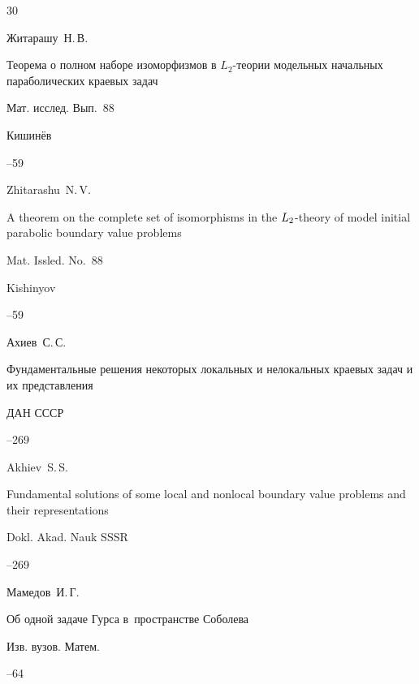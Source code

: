 \begin{thebibliography}{30}

\by Житарашу~Н.\,В.

\paper Теорема о полном наборе изоморфизмов в $L_2$-теории модельных начальных параболических краевых задач

\inbook Мат. исслед. Вып.~88

\publaddr Кишинёв


--59

\misctransl

\by Zhitarashu~N.\,V.

\paper A theorem on the complete set of isomorphisms in the $L\sb 2$-theory of model initial parabolic boundary value problems

\inbook Mat. Issled.  No.~88

\publaddr Kishinyov


–59




\by Ахиев~С.\,С.

\paper Фундаментальные решения некоторых локальных и нелокальных краевых задач и их представления

\jour ДАН СССР




--269

\misctransl

\by Akhiev~S.\,S. 

\paper Fundamental solutions of some local and nonlocal boundary value problems and their representations

\jour Dokl. Akad. Nauk SSSR 




--269






\by Мамедов~И.\,Г.

\paper Об одной задаче Гурса в~пространстве Соболева

\jour Изв. вузов. Матем.



--64


\end{thebibliography}
